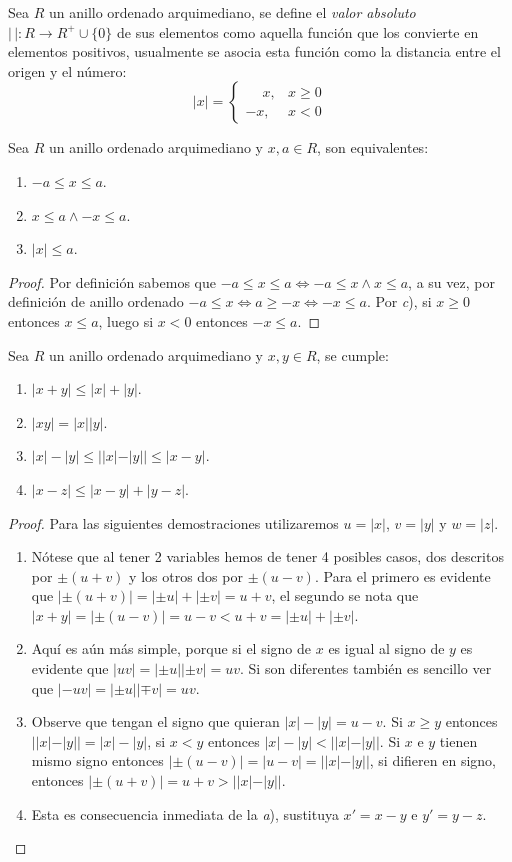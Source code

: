 \documentclass[11pt,oneside,a4paper]{book}
\begin{document}
\begin{mydef}
	Sea $R$ un anillo ordenado arquimediano, se define el \textit{valor absoluto} $|\,|:R\rightarrow R^+\cup\{0\}$ de sus elementos como aquella función que los convierte en elementos positivos, usualmente se asocia esta función como la distancia entre el origen y el número:
	$$|x|=\begin{cases}
		\phantom{-}x,&x\geq 0\\
		-x,&x\lt 0
	\end{cases}$$
\end{mydef}
\begin{thm}
	Sea $R$ un anillo ordenado arquimediano y $x,a\in R$, son equivalentes:
	\begin{enumerate}[\textit{a})]
		\item $-a\leq x\leq a$.
		\item $x\leq a\wedge -x\leq a$.
		\item $|x|\leq a$.
	\end{enumerate}
\end{thm}
\begin{proof}
	Por definición sabemos que $-a\leq x\leq a\iff -a\leq x\wedge x\leq a$, a su vez, por definición de anillo ordenado $-a\leq x\iff a\geq -x\iff -x\leq a$. Por \textit{c}), si $x\geq 0$ entonces $x\leq a$, luego si $x\lt 0$ entonces $-x\leq a$.
\end{proof}
\begin{thm}
	Sea $R$ un anillo ordenado arquimediano y $x,y\in R$, se cumple:
	\begin{enumerate}[$a$)]
		\item $|x+y|\leq|x|+|y|$.
		\item $|xy|=|x||y|$.
		\item $|x|-|y|\leq||x|-|y||\leq|x-y|$.
		\item $|x-z|\leq|x-y|+|y-z|$.
	\end{enumerate}
\end{thm}
\begin{proof}
	Para las siguientes demostraciones utilizaremos $u=|x|$, $v=|y|$ y $w=|z|$.
	\begin{enumerate}[$a$)]
		\item Nótese que al tener 2 variables hemos de tener 4 posibles casos, dos descritos por $\pm(u+v)$ y los otros dos por $\pm(u-v)$. Para el primero es evidente que $|\pm(u+v)|=|\pm u|+|\pm v|=u+v$, el segundo se nota que $|x+y|=|\pm(u-v)|=u-v\lt u+v=|\pm u|+|\pm v|$.
		\item Aquí es aún más simple, porque si el signo de $x$ es igual al signo de $y$ es evidente que $|uv|=|\pm u||\pm v|=uv$. Si son diferentes también es sencillo ver que $|-uv|=|\pm u||\mp v|=uv$.
		\item Observe que tengan el signo que quieran $|x|-|y|=u-v$. Si $x\geq y$ entonces $||x|-|y||=|x|-|y|$, si $x\lt y$ entonces $|x|-|y|\lt||x|-|y||$. Si $x$ e $y$ tienen mismo signo entonces $|\pm(u-v)|=|u-v|=||x|-|y||$, si difieren en signo, entonces $|\pm(u+v)|=u+v\gt||x|-|y||$.
		\item Esta es consecuencia inmediata de la \textit{a}), sustituya $x'=x-y$ e $y'=y-z$.
	\end{enumerate}
\end{proof}
\end{document}
